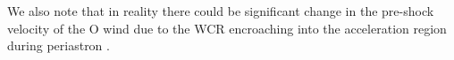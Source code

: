 \documentclass[fleqn,usenatbib]{mnras}
\begin{document}
We also note that in reality there could be significant change in the pre-shock velocity of the O wind due to the WCR encroaching into the acceleration region during periastron \citep{sugawaraSuzakuMonitoringWolf2015}.




\end{document}
